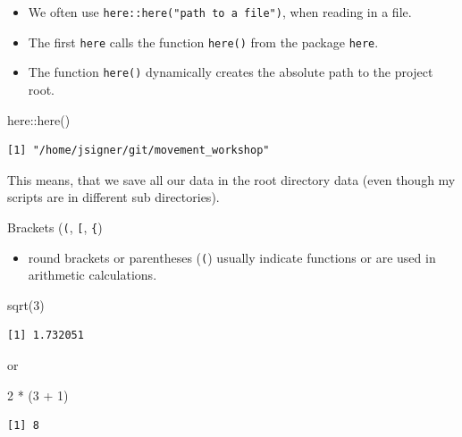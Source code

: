 \documentclass[ignorenonframetext,,t]{beamer}
\providecommand{\tightlist}{%
\setlength{\itemsep}{0pt}\setlength{\parskip}{0pt}}
\newenvironment{Shaded}{\begin{snugshade}}{\end{snugshade}}
\newcommand{\DecValTok}[1]{\textcolor[rgb]{0.00,0.00,0.81}{#1}}
\newcommand{\FunctionTok}[1]{\textcolor[rgb]{0.00,0.00,0.00}{#1}}
\newcommand{\NormalTok}[1]{#1}
\newcommand{\SpecialCharTok}[1]{\textcolor[rgb]{0.00,0.00,0.00}{#1}}
\providecommand{\tightlist}{%
\setlength{\itemsep}{0pt}\setlength{\parskip}{0pt}}
\renewcommand{\tightlist}{\setlength{\itemsep}{1.4ex}\setlength{\parskip}{0pt}}
\begin{document}
\begin{frame}[fragile]
\begin{itemize}
\tightlist
\item
  We often use \texttt{here::here("path\ to\ a\ file")}, when reading in
  a file.
\item
  The first \texttt{here} calls the function \texttt{here()} from the
  package \texttt{here}.
\item
  The function \texttt{here()} dynamically creates the absolute path to
  the project root.
\end{itemize}

\begin{Shaded}
\begin{Highlighting}[]
\NormalTok{here}\SpecialCharTok{::}\FunctionTok{here}\NormalTok{()}
\end{Highlighting}
\end{Shaded}

\begin{verbatim}
[1] "/home/jsigner/git/movement_workshop"
\end{verbatim}

This means, that we save all our data in the root directory data (even
though my scripts are in different sub directories).
\end{frame}

\begin{frame}[fragile]
\begin{block}{Brackets (\texttt{(}, \texttt{{[}}, \texttt{\{})}
\protect\hypertarget{brackets}{}
\begin{itemize}
\tightlist
\item
  round brackets or parentheses (\texttt{(}) usually indicate functions
  or are used in arithmetic calculations.
\end{itemize}

\begin{Shaded}
\begin{Highlighting}[]
\FunctionTok{sqrt}\NormalTok{(}\DecValTok{3}\NormalTok{)}
\end{Highlighting}
\end{Shaded}

\begin{verbatim}
[1] 1.732051
\end{verbatim}

or

\begin{Shaded}
\begin{Highlighting}[]
\DecValTok{2} \SpecialCharTok{*}\NormalTok{ (}\DecValTok{3} \SpecialCharTok{+} \DecValTok{1}\NormalTok{)}
\end{Highlighting}
\end{Shaded}

\begin{verbatim}
[1] 8
\end{verbatim}
\end{block}
\end{frame}
\end{document}
